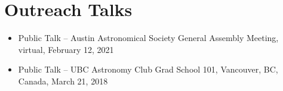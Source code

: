 \documentclass[12pt,a4paper,sans,xetex]{moderncv}        %
\begin{document}
\section{Outreach Talks}
\begin{itemize}
    \item Public Talk -- Austin Astronomical Society General Assembly Meeting, virtual, February 12, 2021
    \item Public Talk -- UBC Astronomy Club Grad School 101, Vancouver, BC, Canada, March 21, 2018
\end{itemize}






\end{document}
